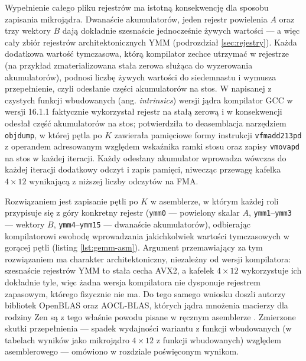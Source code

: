 \documentclass[a4paper,12pt]{book} %
\begin{document}
Wypełnienie całego pliku rejestrów ma istotną konsekwencję dla sposobu zapisania mikrojądra. Dwanaście akumulatorów, jeden rejestr powielenia $A$ oraz trzy wektory $B$ dają dokładnie szesnaście jednocześnie żywych wartości --- a więc cały zbiór rejestrów architektonicznych YMM (podrozdział \ref{sec:rejestry}). Każda dodatkowa wartość tymczasowa, którą kompilator zechce utrzymać w rejestrze (na przykład zmaterializowana stała zerowa służąca do wyzerowania akumulatorów), podnosi liczbę żywych wartości do siedemnastu i wymusza przepełnienie, czyli odesłanie części akumulatorów na stos. W napisanej z czystych funkcji wbudowanych (ang. \emph{intrinsics}) wersji jądra kompilator GCC w wersji 16.1.1 faktycznie wykorzystał rejestr na stałą zerową i w konsekwencji odesłał część akumulatorów na stos; potwierdziła to deasemblacja narzędziem \texttt{objdump}, w której pętla po $K$ zawierała pamięciowe formy instrukcji \texttt{vfmadd213pd} z operandem adresowanym względem wskaźnika ramki stosu oraz zapisy \texttt{vmovapd} na stos w każdej iteracji. Każdy odesłany akumulator wprowadza wówczas do każdej iteracji dodatkowy odczyt i zapis pamięci, niwecząc przewagę kafelka $4 \times 12$ wynikającą z niższej liczby odczytów na FMA.

Rozwiązaniem jest zapisanie pętli po $K$ w asemblerze, w którym każdej roli przypisuje się z góry konkretny rejestr (\texttt{ymm0} --- powielony skalar $A$, \texttt{ymm1}--\texttt{ymm3} --- wektory $B$, \texttt{ymm4}--\texttt{ymm15} --- dwanaście akumulatorów), odbierając kompilatorowi swobodę wprowadzania jakichkolwiek wartości tymczasowych w gorącej pętli (listing \ref{lst:gemm-asm}). Argument przemawiający za tym rozwiązaniem ma charakter architektoniczny, niezależny od wersji kompilatora: szesnaście rejestrów YMM to stała cecha AVX2, a kafelek $4 \times 12$ wykorzystuje ich dokładnie tyle, więc żadna wersja kompilatora nie dysponuje rejestrem zapasowym, którego fizycznie nie ma. Do tego samego wniosku doszli autorzy bibliotek OpenBLAS oraz AOCL-BLAS, których jądra mnożenia macierzy dla rodziny Zen są z tego właśnie powodu pisane w ręcznym asemblerze \cite{zhang2012openblas,vanzee2015blis}. Zmierzone skutki przepełnienia --- spadek wydajności wariantu z funkcji wbudowanych (w tabelach wyników jako mikrojądro $4 \times 12$ z funkcji wbudowanych) względem asemblerowego --- omówiono w rozdziale poświęconym wynikom.
\end{document}
